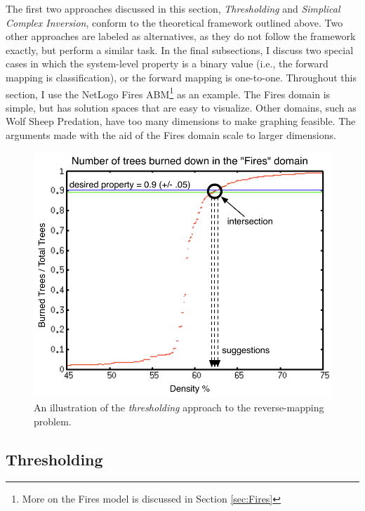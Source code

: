 The first two approaches discussed in this section, \textit{Thresholding} and \textit{Simplical Complex Inversion}, conform to the theoretical framework outlined above.
Two other approaches are labeled as alternatives, as they do not follow the framework exactly, but perform a similar task.
In the final subsections, I discuss two special cases in which the system-level property is a binary value (i.e., the forward mapping is classification), or the forward mapping is one-to-one.
Throughout this section, I use the NetLogo Fires ABM\footnote{More on the Fires model is discussed in Section \ref{sec:Fires}} as an example.
The Fires domain is simple, but has solution spaces that are easy to visualize.
Other domains, such as Wolf Sheep Predation, have too many dimensions to make graphing feasible.
The arguments made with the aid of the Fires domain scale to larger dimensions.


\begin{figure}[ht]
\centering
\includegraphics[scale=.66666667]{images/firesthreshold.pdf}
\caption{An illustration of the \textit{thresholding} approach to the reverse-mapping problem.}
\label{fig:firethresh}
\end{figure}

\subsection{Thresholding}

